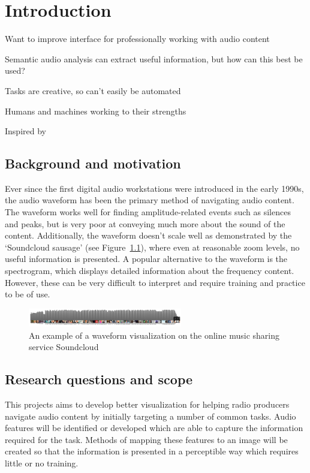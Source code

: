 \chapter{Introduction}\label{chp:intro}

Want to improve interface for professionally working with audio content

Semantic audio analysis can extract useful information, but how can this best be used?

Tasks are creative, so can't easily be automated

Humans and machines working to their strengths

Inspired by \citet{Loviscach2013}

\section{Background and motivation}\label{sec:intro-motivation}
Ever since the first digital audio workstations were introduced in the early
1990s, the audio waveform has been the primary method of navigating audio
content. The waveform works well for finding amplitude-related events such as
silences and peaks, but is very poor at conveying much more about the sound of
the content. Additionally, the waveform doesn't scale well as demonstrated by
the `Soundcloud sausage' (see Figure~\ref{fig:soundcloud}), where even at
reasonable zoom levels, no useful information is presented.  A popular
alternative to the waveform is the spectrogram, which displays detailed
information about the frequency content. However, these can be very difficult
to interpret and require training and practice to be of use.

\begin{figure}[ht]
  \centering
  \includegraphics[width=0.6\textwidth]{figs/soundcloud.png}
  \caption{An example of a waveform visualization on the online music sharing
    service Soundcloud}
  \label{fig:soundcloud}
\end{figure}

\section{Research questions and scope}\label{sec:intro-questions}
This projects aims to develop better visualization for helping radio producers
navigate audio content by initially targeting a number of common tasks. Audio
features will be identified or developed which are able to capture the
information required for the task. Methods of mapping these features to an
image will be created so that the information is presented in a perceptible way
which requires little or no training. 

